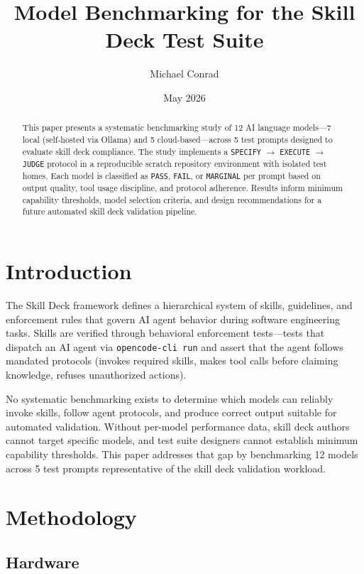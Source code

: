 \documentclass[11pt,a4paper]{article}
\title{Model Benchmarking for the Skill Deck Test Suite}
\author{Michael Conrad}
\date{May 2026}
\begin{document}
\maketitle

\begin{abstract}
This paper presents a systematic benchmarking study of 12 AI language models—7 local (self-hosted via Ollama) and 5 cloud-based—across 5 test prompts designed to evaluate skill deck compliance. The study implements a \texttt{SPECIFY} $\rightarrow$ \texttt{EXECUTE} $\rightarrow$ \texttt{JUDGE} protocol in a reproducible scratch repository environment with isolated test homes. Each model is classified as \texttt{PASS}, \texttt{FAIL}, or \texttt{MARGINAL} per prompt based on output quality, tool usage discipline, and protocol adherence. Results inform minimum capability thresholds, model selection criteria, and design recommendations for a future automated skill deck validation pipeline.
\end{abstract}

\section{Introduction}

The Skill Deck framework defines a hierarchical system of skills, guidelines, and enforcement rules that govern AI agent behavior during software engineering tasks. Skills are verified through behavioral enforcement tests—tests that dispatch an AI agent via \texttt{opencode-cli run} and assert that the agent follows mandated protocols (invokes required skills, makes tool calls before claiming knowledge, refuses unauthorized actions).

No systematic benchmarking exists to determine which models can reliably invoke skills, follow agent protocols, and produce correct output suitable for automated validation. Without per-model performance data, skill deck authors cannot target specific models, and test suite designers cannot establish minimum capability thresholds. This paper addresses that gap by benchmarking 12 models across 5 test prompts representative of the skill deck validation workload.

\section{Methodology}

\subsection{Hardware}
\end{document}
